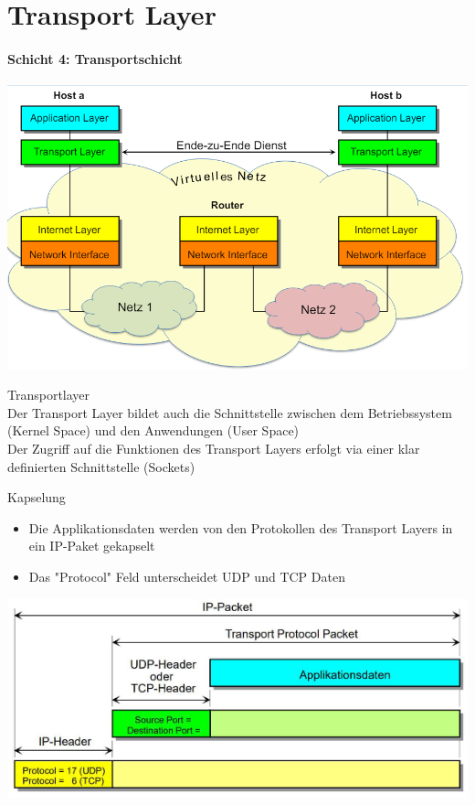 \section{Transport Layer}
\paragraph{Schicht 4: Transportschicht}

\includegraphics[width=0.75\linewidth]{images/transportlayer.png}

\begin{definition}{Transportlayer}\\
    Der Transport Layer bildet auch die Schnittstelle zwischen dem Betriebssystem (Kernel Space) und den Anwendungen (User Space)\\
    Der Zugriff auf die Funktionen des Transport Layers erfolgt via einer klar definierten Schnittstelle (Sockets)
\end{definition}

\begin{definition}{Kapselung}
    \begin{itemize}
        \item Die Applikationsdaten werden von den Protokollen des Transport Layers in ein IP-Paket gekapselt
        \item Das "Protocol" Feld unterscheidet UDP und TCP Daten
    \end{itemize}
    \includegraphics[width=1\linewidth]{images/tcp_udp_header.png}
\end{definition}

